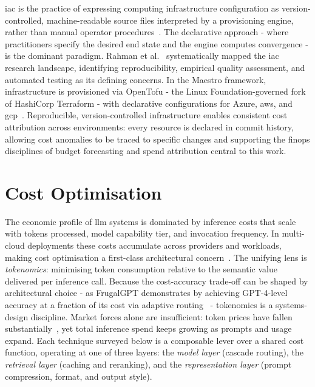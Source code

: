 \Acrfull{iac} is the practice of expressing computing infrastructure configuration as version-controlled, machine-readable source files interpreted by a provisioning engine, rather than manual operator procedures~\cite{rahman2019iac}. The declarative approach - where practitioners specify the desired end state and the engine computes convergence - is the dominant paradigm. Rahman et al.~\cite{rahman2019iac} systematically mapped the \gls{iac} research landscape, identifying reproducibility, empirical quality assessment, and automated testing as its defining concerns. In the Maestro framework, infrastructure is provisioned via OpenTofu - the Linux Foundation-governed fork of HashiCorp Terraform - with declarative configurations for Azure, \gls{aws}, and \gls{gcp}~\cite{closer2025maestro}. Reproducible, version-controlled infrastructure enables consistent cost attribution across environments: every resource is declared in commit history, allowing cost anomalies to be traced to specific changes and supporting the \gls{finops} disciplines of budget forecasting and spend attribution central to this work.

\section{Cost Optimisation}
\label{sec:cost-optimization}

The economic profile of \gls{llm} systems is dominated by inference costs that scale with tokens processed, model capability tier, and invocation frequency. In multi-cloud deployments these costs accumulate across providers and workloads, making cost optimisation a first-class architectural concern~\cite{armbrust2010view,closer2025maestro}. The unifying lens is \emph{tokenomics}: minimising token consumption relative to the semantic value delivered per inference call. Because the cost-accuracy trade-off can be shaped by architectural choice - as FrugalGPT demonstrates by achieving GPT-4-level accuracy at a fraction of its cost via adaptive routing~\cite{chen2023frugalgpt} - tokenomics is a systems-design discipline. Market forces alone are insufficient: token prices have fallen substantially~\cite{a16z2024llmflation}, yet total inference spend keeps growing as prompts and usage expand. Each technique surveyed below is a composable lever over a shared cost function, operating at one of three layers: the \emph{model layer} (cascade routing), the \emph{retrieval layer} (caching and reranking), and the \emph{representation layer} (prompt compression, format, and output style).

